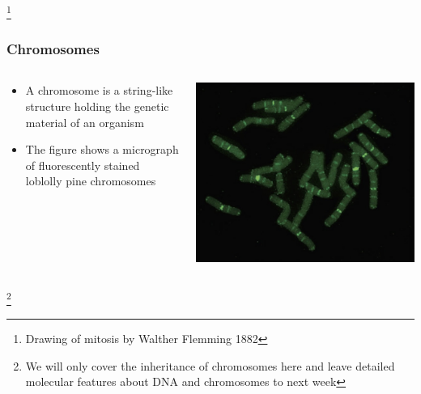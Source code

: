\documentclass{beamer}
\newcommand\blfootnote[1]{%
	\begingroup
	\renewcommand\thefootnote{}\footnote{#1}%
	\addtocounter{footnote}{-1}%
	\endgroup
}
\begin{document}
\begin{frame}
\begin{columns}
\begin{column}{0.6\textwidth}
\begin{itemize}
	\end{itemize}
	\end{column}

	\end{columns}
		\blfootnote{Drawing of mitosis by Walther Flemming 1882}

	
\end{frame}

\begin{frame}
	
\frametitle{Chromosomes}

\begin{columns}
	
\begin{column}{0.4\textwidth}
	\begin{itemize}
	\item A chromosome is a string-like structure holding the genetic material of an organism
	\item  The figure shows a micrograph of fluorescently stained loblolly pine chromosomes
\end{itemize}
\end{column}
\begin{column}{0.6\textwidth}
			\includegraphics[keepaspectratio, width  =\textwidth]{img/loblollyChroms}
\end{column}
\end{columns}
\blfootnote{We will only cover the inheritance of chromosomes here and leave detailed molecular features about DNA and chromosomes to next week}
\end{frame}
\end{document}
